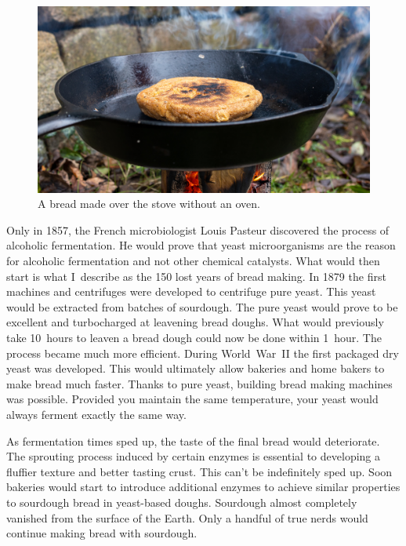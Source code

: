 \begin{figure}[ht]
  \includegraphics[width=\textwidth]{sourdough-stove}
  \caption{A bread made over the stove without an oven.}%
  \label{sourdough-stove}
\end{figure}

Only in 1857, the French microbiologist Louis Pasteur discovered
the process of alcoholic fermentation. He would prove that
yeast microorganisms are the reason for alcoholic fermentation
and not other chemical catalysts. What would then start is
what I~describe as the 150 lost years of bread making. In 1879
the first machines and centrifuges were developed to centrifuge
pure yeast. This yeast would be extracted from batches of sourdough.
The pure yeast would prove to be excellent and turbocharged
at leavening bread doughs. What would previously take 10~hours
to leaven a bread dough could now be done within 1~hour.
The process became much more efficient. During World~War~II
the first packaged dry yeast was developed. This would ultimately
allow bakeries and home bakers to make bread much faster.
Thanks to pure yeast, building bread making machines was
possible. Provided you maintain the same temperature,
your yeast would always ferment exactly the same way.

As fermentation
times sped up, the taste of the final bread would deteriorate.
The sprouting process induced by certain enzymes is essential
to developing a fluffier texture and better tasting crust. This
can't be indefinitely sped up. Soon bakeries would start
to introduce additional enzymes to achieve similar properties
to sourdough bread in yeast-based doughs. Sourdough almost completely
vanished from the surface of the Earth. Only a handful
of true nerds would continue making bread with sourdough.

